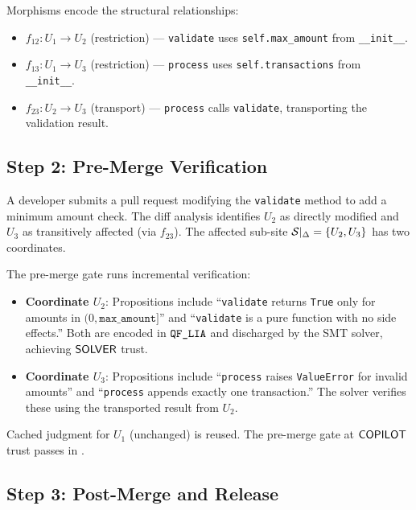 \documentclass[11pt]{article}
\begin{document}
Morphisms encode the structural relationships:
\begin{itemize}[leftmargin=*]
  \item $f_{12} : U_1 \to U_2$ (restriction) --- \texttt{validate} uses
        \texttt{self.max\_amount} from \texttt{\_\_init\_\_}.
  \item $f_{13} : U_1 \to U_3$ (restriction) --- \texttt{process} uses
        \texttt{self.transactions} from \texttt{\_\_init\_\_}.
  \item $f_{23} : U_2 \to U_3$ (transport) --- \texttt{process} calls
        \texttt{validate}, transporting the validation result.
\end{itemize}

\subsection{Step 2: Pre-Merge Verification}

A developer submits a pull request modifying the \texttt{validate} method to
add a minimum amount check. The diff analysis identifies $U_2$ as directly
modified and $U_3$ as transitively affected (via $f_{23}$). The affected
sub-site $\mathcal{S}|_\Delta = \{U_2, U_3\}$ has two coordinates.

The pre-merge gate runs incremental verification:
\begin{itemize}[leftmargin=*]
  \item \textbf{Coordinate $U_2$}: Propositions include ``\texttt{validate}
        returns \texttt{True} only for amounts in $(0, \texttt{max\_amount}]$''
        and ``\texttt{validate} is a pure function with no side effects.''
        Both are encoded in $\texttt{QF\_LIA}$ and discharged by the SMT solver,
        achieving $\mathsf{SOLVER}$ trust.
  \item \textbf{Coordinate $U_3$}: Propositions include ``\texttt{process}
        raises \texttt{ValueError} for invalid amounts'' and
        ``\texttt{process} appends exactly one transaction.'' The solver
        verifies these using the transported result from $U_2$.
\end{itemize}

Cached judgment for $U_1$ (unchanged) is reused. The pre-merge gate at
$\mathsf{COPILOT}$ trust passes in \ppLXVcipaymentprocessorPre{}.

\subsection{Step 3: Post-Merge and Release}
\end{document}
